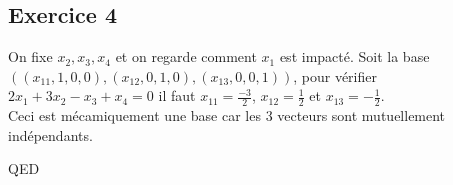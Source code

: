 \documentclass[]{book}
\theoremstyle{definition}
\begin{document}
\subsection*{Exercice 4}
On fixe $x_2, x_3,x_4$ et on regarde comment $x_1$ est impact\'e. Soit la base $( (x_{11},1,0,0), (x_{12},0,1,0), (x_{13},0,0,1))$, pour v\'erifier $2x_1+3x_2 -x_3+x_4 = 0$ il faut $x_{11}=\frac{-3}{2}$, $x_{12}=\frac{1}{2}$ et $x_{13}=-\frac{1}{2}$.\\
Ceci est m\'ecamiquement une base car les 3 vecteurs sont mutuellement ind\'ependants.



QED
\end{document}
